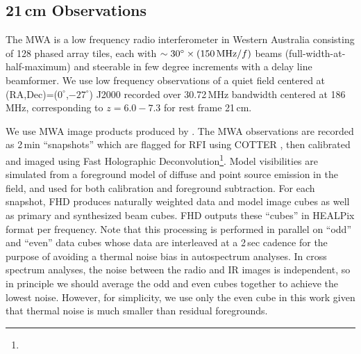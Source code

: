 \documentclass[numberedappendix]{emulateapj}
\begin{document}
\subsection{21\,cm Observations}
\label{sec:mwaobservations}

The MWA is a low frequency radio interferometer in Western Australia consisting of 128 phased array tiles, each with $\sim30^\circ\times(150\text{\,MHz}/f)$  beams (full-width-at-half-maximum) and steerable in few degree increments with a delay line beamformer. We use low frequency observations of a quiet field centered at (RA,Dec)=($0^\circ$,$-27^\circ$) J2000 recorded over 30.72\,MHz bandwidth centered at 186\,MHz, corresponding to $z=6.0-7.3$ for rest frame 21\,cm. 

We use MWA image products produced by \citet{beardsley16}. The MWA observations are recorded as 2\,min ``snapshots'' which are flagged for RFI using COTTER \citep{AndreMWARFI}, then calibrated and imaged using Fast Holographic Deconvolution\footnote{}. Model visibilities are simulated from a foreground model of diffuse  and point source \citep{PattiCatalog1} emission in the field, and used for both calibration and foreground subtraction. For each snapshot, FHD produces naturally weighted data and model image cubes as well as primary and synthesized beam cubes. FHD outputs these ``cubes'' in HEALPix format per frequency. Note that this processing is performed in parallel on ``odd'' and ``even'' data cubes whose data are interleaved at a 2\,sec cadence for the purpose of avoiding a thermal noise bias in autospectrum analyses. In cross spectrum analyses, the noise between the radio and IR images is independent, so in principle we should average the odd and even cubes together to achieve the lowest noise. However, for simplicity, we use only the even cube in this work given that thermal noise is much smaller than residual foregrounds.
\end{document}
